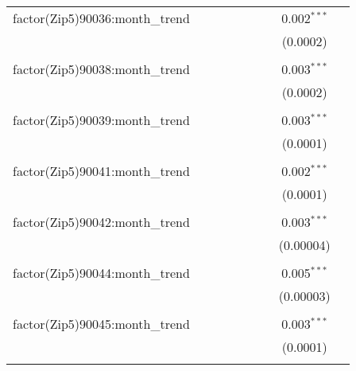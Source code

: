 \begin{table}[H]
{\begin{tabular}{@{\extracolsep{5pt}}lcccccccc}
  factor(Zip5)90036:month\_trend &  &  &  &  &  &  & 0.002$^{***}$ &  \\  

   &  &  &  &  &  &  & (0.0002) &  \\  

   & & & & & & & & \\  

  factor(Zip5)90038:month\_trend &  &  &  &  &  &  & 0.003$^{***}$ &  \\  

   &  &  &  &  &  &  & (0.0002) &  \\  

   & & & & & & & & \\  

  factor(Zip5)90039:month\_trend &  &  &  &  &  &  & 0.003$^{***}$ &  \\  

   &  &  &  &  &  &  & (0.0001) &  \\  

   & & & & & & & & \\  

  factor(Zip5)90041:month\_trend &  &  &  &  &  &  & 0.002$^{***}$ &  \\  

   &  &  &  &  &  &  & (0.0001) &  \\  

   & & & & & & & & \\  

  factor(Zip5)90042:month\_trend &  &  &  &  &  &  & 0.003$^{***}$ &  \\  

   &  &  &  &  &  &  & (0.00004) &  \\  

   & & & & & & & & \\  

  factor(Zip5)90044:month\_trend &  &  &  &  &  &  & 0.005$^{***}$ &  \\  

   &  &  &  &  &  &  & (0.00003) &  \\  

   & & & & & & & & \\  

  factor(Zip5)90045:month\_trend &  &  &  &  &  &  & 0.003$^{***}$ &  \\  

   &  &  &  &  &  &  & (0.0001) &  \\  

   & & & & & & & & \\  


\end{tabular}}
\end{table}
